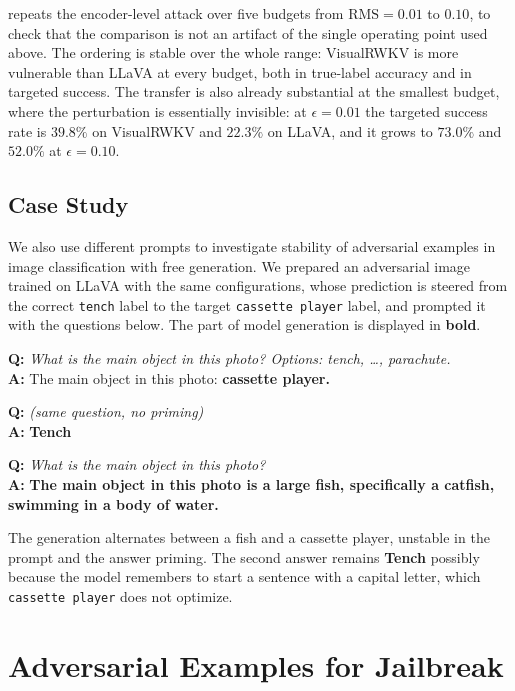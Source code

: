 \documentclass[conference]{IEEEtran}
\newenvironment{qa}%
  {\par\addvspace{2pt}\begingroup\footnotesize
   \setlength{\leftskip}{0.9em}\setlength{\parindent}{0pt}\setlength{\parskip}{1pt}}%
  {\par\endgroup\addvspace{2pt}}
\begin{document}
 repeats the encoder-level attack over five budgets from
$\mathrm{RMS}=0.01$ to $0.10$, to check that the comparison is not an
artifact of the single operating point used above. The ordering is stable over the whole range: VisualRWKV is
more vulnerable than LLaVA at every budget, both in true-label accuracy and
in targeted success. The transfer is also already substantial at the
smallest budget, where the perturbation is essentially invisible: at
$\epsilon=0.01$ the targeted success rate is $39.8\%$ on VisualRWKV and
$22.3\%$ on LLaVA, and it grows to $73.0\%$ and $52.0\%$ at
$\epsilon=0.10$.

\subsection{Case Study}

We also use different prompts to investigate stability of adversarial
examples in image classification with free generation. We prepared an
adversarial image trained on LLaVA with the same configurations, whose
prediction is steered from the correct \texttt{tench} label to the target
\texttt{cassette player} label, and prompted it with the questions below.
The part of model generation is displayed in \textbf{bold}.

\begin{qa}
\textbf{Q:} \textit{What is the main object in this photo? Options: tench, \dots, parachute.}\\
\textbf{A:} The main object in this photo: \textbf{cassette player.}
\par
\textbf{Q:} \textit{(same question, no priming)}\\
\textbf{A:} \textbf{Tench}
\par
\textbf{Q:} \textit{What is the main object in this photo?}\\
\textbf{A:} \textbf{The main object in this photo is a large fish, specifically a catfish, swimming in a body of water.}
\end{qa}

\noindent The generation alternates between a fish and a cassette player,
unstable in the prompt and the answer priming. The second answer remains
\textbf{Tench} possibly because the model remembers to start a sentence with
a capital letter, which \texttt{cassette player} does not optimize.

\section{Adversarial Examples for Jailbreak}
\end{document}

